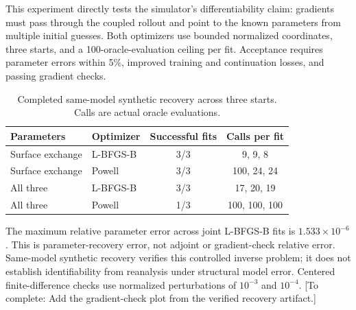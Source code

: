 \documentclass{article}
\newcommand{\pending}[1]{\textcolor{blue!65!black}{[To complete: #1]}}
\begin{document}
This experiment directly tests the simulator's differentiability claim:
gradients must pass through the coupled rollout and point to the known
parameters from multiple initial guesses. Both optimizers use bounded normalized coordinates, three starts, and a
100-oracle-evaluation ceiling per fit. Acceptance requires parameter errors
within 5\%, improved training and continuation losses, and passing gradient
checks.
\begin{table}[t]
\centering
\caption{Completed same-model synthetic recovery across three starts.
Calls are actual oracle evaluations.}
\begin{tabular}{llcc}
\toprule
Parameters & Optimizer & Successful fits & Calls per fit\\
\midrule
Surface exchange & L-BFGS-B & 3/3 & 9, 9, 8\\
Surface exchange & Powell & 3/3 & 100, 24, 24\\
All three & L-BFGS-B & 3/3 & 17, 20, 19\\
All three & Powell & 1/3 & 100, 100, 100\\
\bottomrule
\end{tabular}
\end{table}
The maximum relative parameter error across joint L-BFGS-B fits is
\(1.533\times10^{-6}\). This is parameter-recovery error, not adjoint or
gradient-check relative error. Same-model synthetic recovery verifies this
controlled inverse problem; it does not establish identifiability from
reanalysis under structural model error. Centered finite-difference checks use normalized
perturbations of \(10^{-3}\) and \(10^{-4}\).
\pending{Add the gradient-check plot from the verified recovery artifact.}
\end{document}
